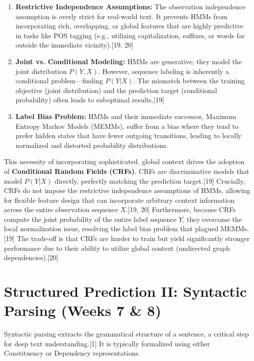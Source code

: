 \documentclass{article}
\begin{document}
\begin{enumerate}
    \item \textbf{Restrictive Independence Assumptions:} The observation independence assumption is overly strict for real-world text. It prevents HMMs from incorporating rich, overlapping, or global features that are highly predictive in tasks like POS tagging (e.g., utilizing capitalization, suffixes, or words far outside the immediate vicinity).[19, 20]
    \item \textbf{Joint vs. Conditional Modeling:} HMMs are generative; they model the joint distribution $P(Y, X)$. However, sequence labeling is inherently a conditional problem—finding $P(Y|X)$. The mismatch between the training objective (joint distribution) and the prediction target (conditional probability) often leads to suboptimal results.[19]
    \item \textbf{Label Bias Problem:} HMMs and their immediate successor, Maximum Entropy Markov Models (MEMMs), suffer from a bias where they tend to prefer hidden states that have fewer outgoing transitions, leading to locally normalized and distorted probability distributions.
\end{enumerate}

This necessity of incorporating sophisticated, global context drives the adoption of \textbf{Conditional Random Fields (CRFs)}. CRFs are discriminative models that model $P(Y|X)$ directly, perfectly matching the prediction target.[19] Crucially, CRFs do not impose the restrictive independence assumptions of HMMs, allowing for flexible feature design that can incorporate arbitrary context information across the entire observation sequence $X$.[19, 20] Furthermore, because CRFs compute the joint probability of the entire label sequence $Y$, they overcome the local normalization issue, resolving the label bias problem that plagued MEMMs.[19] The trade-off is that CRFs are harder to train but yield significantly stronger performance due to their ability to utilize global context (undirected graph dependencies).[20]

\section{Structured Prediction II: Syntactic Parsing (Weeks 7 \& 8)}

Syntactic parsing extracts the grammatical structure of a sentence, a critical step for deep text understanding.[1] It is typically formalized using either Constituency or Dependency representations.
\end{document}
